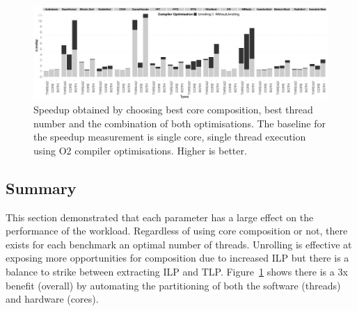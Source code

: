 \begin{landscape}
\begin{figure}\hspace{-1em}
    \includegraphics[width=1\linewidth,keepaspectratio]{streamit-paper/graphics/threadcompbench.pdf}
    \caption{Speedup obtained by choosing best core composition, best
      thread number and the combination of both optimisations. The baseline for the speedup measurement is single core, single thread execution using O2 compiler optimisations. Higher
      is better.}\label{fig:overviewhist}
\end{figure}
\end{landscape}
\subsection{Summary}
This section demonstrated that each parameter has a large effect on the performance of the workload.
Regardless of using core composition or not, there exists for each benchmark an optimal number of threads.
Unrolling is effective at exposing more opportunities for composition due to increased ILP but there is a balance to strike between extracting ILP and TLP.
Figure~\ref{fig:overviewhist} shows there is a 3x benefit (overall) by automating the partitioning of both the software (threads) and hardware (cores).

